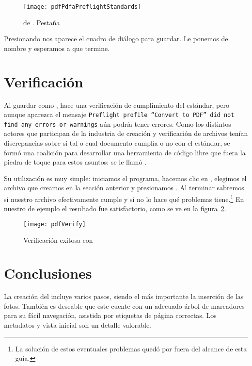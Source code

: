 \documentclass[%
	a5paper,
	10pt,
	twoside,
	openright,
	final,
]{memoir}
\begin{document}
{	\begin{figure}
		\texttt{[image: pdfPdfaPreflightStandards]}
		\caption[\texttt{Preflight} de \acrobat]{ de \acrobat. Pestaña \label{fig:pdfPdfaPreflightStandards}}
	\end{figure}

	Presionando  nos aparece el cuadro de diálogo para guardar. Le ponemos de nombre  y esperamos a que termine.

	\section{Verificación} Al guardar como \pdfa, \acrobat hace una verificación de cumplimiento del estándar, pero aunque aparezca el mensaje \texttt{Preflight profile ``Convert to PDF'' did not find any errors or warnings} aún podría tener errores. Como los distintos actores que participan de la industria de creación y verificación de archivos \pdfa tenían discrepancias sobre si tal o cual documento cumplía o no con el estándar, se formó una coalición para desarrollar una herramienta de código libre que fuera la piedra de toque para estos asuntos: se le llamó \veraPDF.

	Su utilización es muy simple: iniciamos el programa, hacemos clic en , elegimos el archivo que creamos en la sección anterior y presionamos . Al terminar sabremos si nuestro archivo efectivamente cumple y si no lo hace qué problemas tiene.\footnote{La solución de estos eventuales problemas quedó por fuera del alcance de esta guía.} En nuestro \pdf de ejemplo el resultado fue satisfactorio, como se ve en la figura~\ref{fig:pdfVerify}.

	\begin{figure}
		\texttt{[image: pdfVerify]}
		\caption{Verificación exitosa con \veraPDF\label{fig:pdfVerify}}
	\end{figure}

	\section{Conclusiones} La creación del \pdf incluye varios pasos, siendo el más importante la inserción de las fotos. También es deseable que este cuente con un adecuado árbol de marcadores para su fácil navegación, asistida por etiquetas de página correctas. Los metadatos y vista inicial son un detalle valorable.

}
\end{document}
